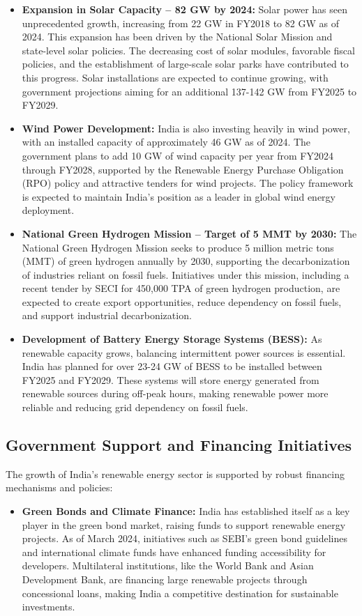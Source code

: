 \documentclass[12pt]{article}
\begin{document}
\begin{spacing}{1.5}
\begin{itemize}
    \item \textbf{Expansion in Solar Capacity – 82 GW by 2024:} Solar power has seen unprecedented growth, increasing from 22 GW in FY2018 to 82 GW as of 2024. This expansion has been driven by the National Solar Mission and state-level solar policies. The decreasing cost of solar modules, favorable fiscal policies, and the establishment of large-scale solar parks have contributed to this progress. Solar installations are expected to continue growing, with government projections aiming for an additional 137-142 GW from FY2025 to FY2029.
    
    \item \textbf{Wind Power Development:} India is also investing heavily in wind power, with an installed capacity of approximately 46 GW as of 2024. The government plans to add 10 GW of wind capacity per year from FY2024 through FY2028, supported by the Renewable Energy Purchase Obligation (RPO) policy and attractive tenders for wind projects. The policy framework is expected to maintain India's position as a leader in global wind energy deployment.
    
    \item \textbf{National Green Hydrogen Mission – Target of 5 MMT by 2030:} The National Green Hydrogen Mission seeks to produce 5 million metric tons (MMT) of green hydrogen annually by 2030, supporting the decarbonization of industries reliant on fossil fuels. Initiatives under this mission, including a recent tender by SECI for 450,000 TPA of green hydrogen production, are expected to create export opportunities, reduce dependency on fossil fuels, and support industrial decarbonization.
    
    \item \textbf{Development of Battery Energy Storage Systems (BESS):} As renewable capacity grows, balancing intermittent power sources is essential. India has planned for over 23-24 GW of BESS to be installed between FY2025 and FY2029. These systems will store energy generated from renewable sources during off-peak hours, making renewable power more reliable and reducing grid dependency on fossil fuels.
\end{itemize}

\subsection*{Government Support and Financing Initiatives}
The growth of India’s renewable energy sector is supported by robust financing mechanisms and policies:
\begin{itemize}
    \item \textbf{Green Bonds and Climate Finance:} India has established itself as a key player in the green bond market, raising funds to support renewable energy projects. As of March 2024, initiatives such as SEBI’s green bond guidelines and international climate funds have enhanced funding accessibility for developers. Multilateral institutions, like the World Bank and Asian Development Bank, are financing large renewable projects through concessional loans, making India a competitive destination for sustainable investments.
    

\end{itemize}
\end{spacing}
\end{document}
